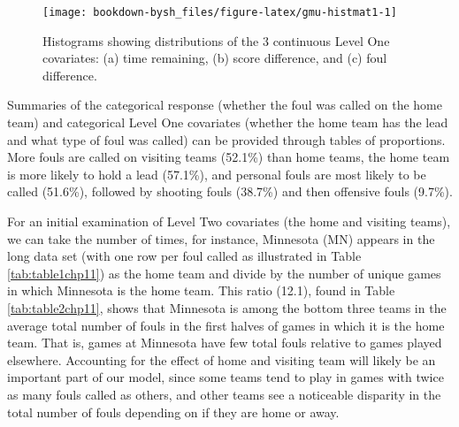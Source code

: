 \documentclass[
]{krantz}
\begin{document}
\begin{figure}

{\centering \texttt{[image: bookdown-bysh\_files/figure-latex/gmu-histmat1-1]} 

}

\caption{Histograms showing distributions of the 3 continuous Level One covariates: (a) time remaining, (b) score difference, and (c) foul difference.}\label{fig:gmu-histmat1}
\end{figure}

Summaries of the categorical response (whether the foul was called on the home team) and categorical Level One covariates (whether the home team has the lead and what type of foul was called) can be provided through tables of proportions. More fouls are called on visiting teams (52.1\%) than home teams, the home team is more likely to hold a lead (57.1\%), and personal fouls are most likely to be called (51.6\%), followed by shooting fouls (38.7\%) and then offensive fouls (9.7\%).

For an initial examination of Level Two covariates (the home and visiting teams), we can take the number of times, for instance, Minnesota (MN) appears in the long data set (with one row per foul called as illustrated in Table \ref{tab:table1chp11}) as the home team and divide by the number of unique games in which Minnesota is the home team. This ratio (12.1), found in Table \ref{tab:table2chp11}, shows that Minnesota is among the bottom three teams in the average total number of fouls in the first halves of games in which it is the home team. That is, games at Minnesota have few total fouls relative to games played elsewhere. Accounting for the effect of home and visiting team will likely be an important part of our model, since some teams tend to play in games with twice as many fouls called as others, and other teams see a noticeable disparity in the total number of fouls depending on if they are home or away.
\end{document}
